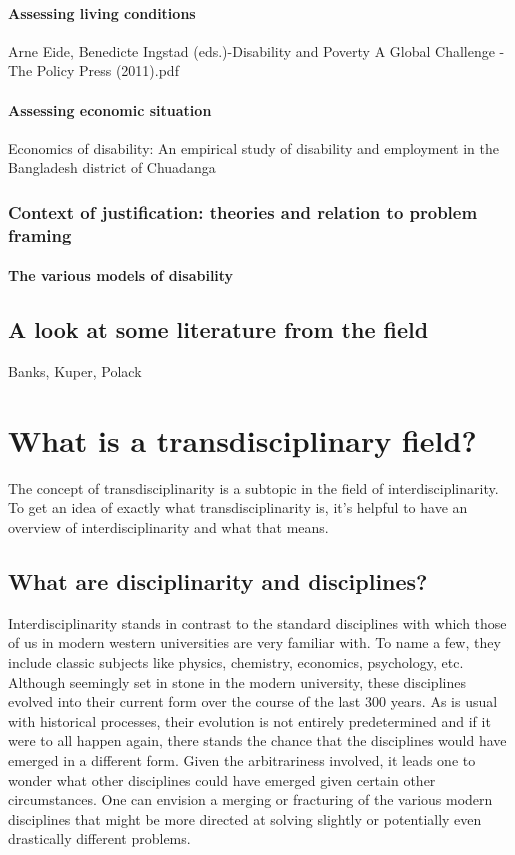 \documentclass{lps}
\begin{document}
\paragraph{Assessing living conditions}
Arne Eide, Benedicte Ingstad (eds.)-Disability and Poverty A Global Challenge  -The Policy Press (2011).pdf
\paragraph{Assessing economic situation}
Economics of disability: An empirical study of disability and employment in the Bangladesh district of Chuadanga
\subsubsection{Context of justification: theories and relation to problem
framing}
\paragraph{The various models of disability}
\subsection{A look at some literature from the field}
Banks, Kuper, Polack
\section{What is a transdisciplinary field?}
The concept of transdisciplinarity is a subtopic in the field of interdisciplinarity. To get an idea of exactly what transdisciplinarity is, it’s helpful to have an overview of interdisciplinarity and what that means.
\subsection{What are disciplinarity and disciplines?}
Interdisciplinarity stands in contrast to the standard disciplines with which those of us in modern western universities are very familiar with. To name a few, they include classic subjects like physics, chemistry, economics, psychology, etc. Although seemingly set in stone in the modern university, these disciplines evolved into their current form over the course of the last 300 years. As is usual with historical processes, their evolution is not entirely predetermined and if it were to all happen again, there stands the chance that the disciplines would have emerged in a different form. Given the arbitrariness involved, it leads one to wonder what other disciplines could have emerged given certain other circumstances. One can envision a merging or fracturing of the various modern disciplines that might be more directed at solving slightly or potentially even drastically different problems. 
\end{document}
